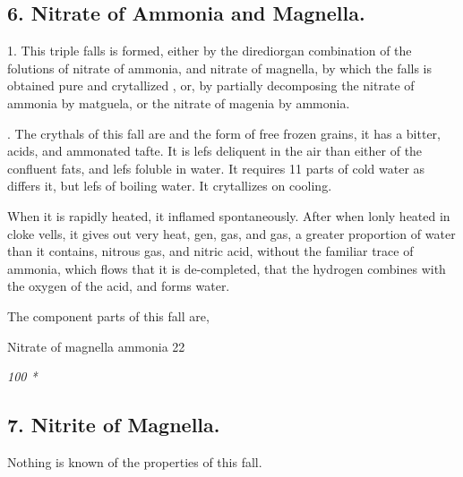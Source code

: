 \subsection*{6. Nitrate of Ammonia and Magnella.}
1. This triple falls is formed, either by the dirediorgan combination of the folutions of nitrate of ammonia, and nitrate of magnella, by which the falls is obtained pure and crytallized , or, by partially decomposing the nitrate of ammonia by matguela, or the nitrate of magenia by ammonia.\par{}. The crythals of this fall are and the form of free frozen grains, it has a bitter, acids, and ammonated tafte. It is lefs deliquent in the air than either of the confluent fats, and lefs foluble in water. It requires 11 parts of cold water as differs it, but lefs of boiling water. It crytallizes on cooling.\par\medskip
When it is rapidly heated, it inflamed spontaneously. After when lonly heated in cloke vells, it gives out very heat, gen, gas, and gas, a greater proportion of water than it contains, nitrous gas, and nitric acid, without the familiar trace of ammonia, which flows that it is de-completed, that the hydrogen combines with the oxygen of the acid, and forms water.\par\medskip
The component parts of this fall are,\par\medskip
Nitrate of magnella
ammonia 22\par\medskip
{\small\itshape 100 *\par}\medskip
\subsection*{7. Nitrite of Magnella.}
Nothing is known of the properties of this fall.\par\medskip
